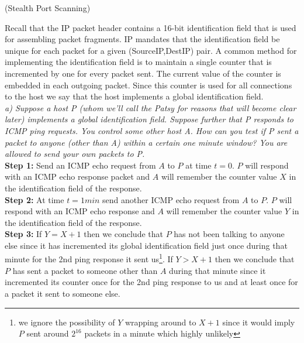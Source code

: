 \begin{prob}  (Stealth Port Scanning) 
\end{prob}

\noindent Recall that the IP packet header contains a 16-bit identification field that is used for assembling packet fragments. IP mandates that the identification field be unique for each packet for a given (SourceIP,DestIP) pair. A common method for implementing the identification field is to maintain a single counter that is incremented by one for every packet sent. The current value of the counter is embedded in each outgoing packet. Since this counter is used for all connections to the host we say that the host implements a global identification field.\\

\noindent \textit{a) Suppose a host P (whom we'll call the Patsy for reasons that will become clear later) implements a global identification field. Suppose further that P responds to ICMP ping requests. You control some other host A. How can you test if P sent a packet to anyone (other than A) within a certain one minute window? You are allowed to send your own packets to P.}\\

\noindent\textbf{Step 1: } Send an ICMP echo request from $A$ to $P$ at time $t=0$. $P$ will respond with an ICMP echo response packet and $A$ will remember the counter value $X$ in the identification field of the response.\\
\noindent\textbf{Step 2: } At time $t=1min$ send another ICMP echo request from $A$ to $P$. $P$ will respond with an ICMP echo response and $A$ will remember the counter value $Y$ in the identification field of the response.\\
\noindent\textbf{Step 3: } If $Y=X+1$ then we conclude that $P$ has not been talking to anyone else since it has incremented its global identification field just once during that minute for the 2nd ping response it sent us\footnote{we ignore the possibility of $Y$ wrapping around to $X+1$ since it would imply $P$ sent around $2^{16}$ packets in a minute which highly unlikely}. If $Y>X+1$ then we conclude that $P$ has sent a packet to someone other than $A$ during that minute since it incremented its counter once for the 2nd ping response to us and at least once for a packet it sent to someone else.\\
 

